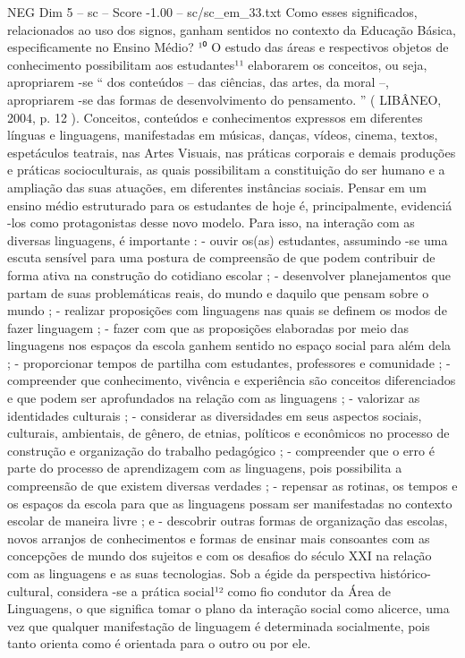\begin{textsample}{NEG Dim 5 – sc – Score -1.00 – sc/sc\_em\_33.txt}
Como esses significados, relacionados ao uso dos signos, ganham sentidos no contexto da Educação Básica, especificamente no Ensino Médio? ¹⁰ O estudo das áreas e respectivos objetos de conhecimento possibilitam aos estudantes¹¹ elaborarem os conceitos, ou seja, apropriarem -se “ dos conteúdos – das ciências, das artes, da moral –, apropriarem -se das formas de desenvolvimento do pensamento. ” ( LIBÂNEO, 2004, p. 12 ).
Conceitos, conteúdos e conhecimentos expressos em diferentes línguas e linguagens, manifestadas em músicas, danças, vídeos, cinema, textos, espetáculos teatrais, nas Artes Visuais, nas práticas corporais e demais produções e práticas socioculturais, as quais possibilitam a constituição do ser humano e a ampliação das suas atuações, em diferentes instâncias sociais.
Pensar em um ensino médio estruturado para os estudantes de hoje é, principalmente, evidenciá -los como protagonistas desse novo modelo.
Para isso, na interação com as diversas linguagens, é importante : - ouvir os(as) estudantes, assumindo -se uma escuta sensível para uma postura de compreensão de que podem contribuir de forma ativa na construção do cotidiano escolar ; - desenvolver planejamentos que partam de suas problemáticas reais, do mundo e daquilo que pensam sobre o mundo ; - realizar proposições com linguagens nas quais se definem os modos de fazer linguagem ; - fazer com que as proposições elaboradas por meio das linguagens nos espaços da escola ganhem sentido no espaço social para além dela ; - proporcionar tempos de partilha com estudantes, professores e comunidade ; - compreender que conhecimento, vivência e experiência são conceitos diferenciados e que podem ser aprofundados na relação com as linguagens ; - valorizar as identidades culturais ; - considerar as diversidades em seus aspectos sociais, culturais, ambientais, de gênero, de etnias, políticos e econômicos no processo de construção e organização do trabalho pedagógico ; - compreender que o erro é parte do processo de aprendizagem com as linguagens, pois possibilita a compreensão de que existem diversas verdades ; - repensar as rotinas, os tempos e os espaços da escola para que as linguagens possam ser manifestadas no contexto escolar de maneira livre ; e - descobrir outras formas de organização das escolas, novos arranjos de conhecimentos e formas de ensinar mais consoantes com as concepções de mundo dos sujeitos e com os desafios do século XXI na relação com as linguagens e as suas tecnologias.
Sob a égide da perspectiva histórico-cultural, considera -se a prática social¹² como fio condutor da Área de Linguagens, o que significa tomar o plano da interação social como alicerce, uma vez que qualquer manifestação de linguagem é determinada socialmente, pois tanto orienta como é orientada para o outro ou por ele.

\end{textsample}
